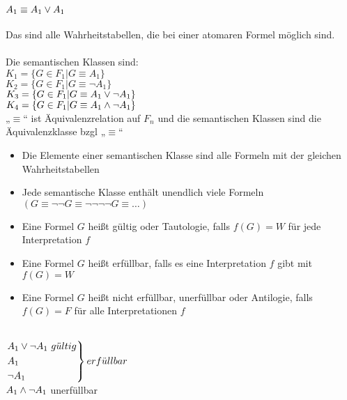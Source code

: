 \noindent\\
$A_1 \equiv A_1 \vee A_1$\\
\noindent\\
Das sind alle Wahrheitstabellen, die bei einer atomaren Formel möglich sind.\\
\noindent\\
Die semantischen Klassen sind:\\
$K_1 = \{G \in F_1 | G \equiv A_1\}$\\
$K_2 = \{G \in F_1 | G \equiv \neg A_1\}$\\
$K_3 = \{G \in F_1 | G \equiv A_1 \vee \neg A_1\}$\\
$K_4 = \{G \in F_1 | G \equiv A_1 \wedge \neg A_1\}$\\
    
\bemerkung{}
„$\equiv$“ ist Äquivalenzrelation auf $F_n$ und die semantischen Klassen sind die Äquivalenzklasse bzgl „$\equiv$“\\
    
\bemerkung{}
\begin{itemize}
\item Die Elemente einer semantischen Klasse sind alle Formeln mit der gleichen Wahrheitstabellen
\item Jede semantische Klasse enthält unendlich viele Formeln\\
    $(G \equiv \neg \neg G \equiv \neg \neg \neg \neg G \equiv … )$
\end{itemize}

\begin{itemize}
\item Eine Formel $G$ heißt gültig oder Tautologie, falls $f(G) = W$ für jede Interpretation $f$
\item Eine Formel $G$ heißt erfüllbar, falls es eine Interpretation $f$ gibt mit $f(G) = W$
\item Eine Formel $G$ heißt nicht erfüllbar, unerfüllbar oder Antilogie, falls $f(G) = F$ für alle Interpretationen $f$
\end{itemize}

\beispiel{}\\
$\begin{rcases} A_1 \OR \neg A_1\ g\ddot{u}ltig \\ A_1 \\ \neg A_1 \end{rcases} erf\ddot{u}llbar$\\
$A_1 \wedge \neg A_1$ unerfüllbar\\

